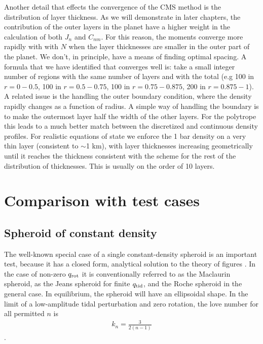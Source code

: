 Another detail that effects the convergence of the CMS method is the distribution of
layer thickness. As we will demonstrate in later chapters, the contribution of the
outer layers in the planet have a higher weight in the calculation of both $J_n$ and
$C_{nm}$. For this reason, the moments converge more rapidly with with $N$ when the
layer thicknesses are smaller in the outer part of the planet. We don't, in
principle, have a means of finding optimal spacing. A formula that we have identified
that converges well is:  take a small integer number of regions with the same number
of layers and with the total (e.g 100 in $r=0-0.5$, 100 in $r=0.5-0.75$, 100 in
$r=0.75-0.875$, 200 in $r=0.875-1$). A related issue is the handling the outer
boundary condition, where the density rapidly changes as a function of radius. A
simple way of handling the boundary is to make the outermost layer half the width of
the other layers. For the polytrope  this leads to a much better match
between the discretized and continuous density profiles. For realistic equations of
state we enforce the 1 bar density on a very thin layer (consistent to $\sim$1 km),
with layer thicknesses increasing geometrically until it reaches the thickness
consistent with the scheme for the rest of the distribution of thicknesses. This is
usually on the order of 10 layers.


\section{Comparison with test cases} \label{tests}

\subsection{Spheroid of constant density} \label{maclaurin}

The well-known special case of a single constant-density spheroid is an
important test, because it has a closed form, analytical solution to the theory
of figures \citep{tassoul2015}. In the case of non-zero $q_{\rm rot}$ it is
conventionally referred to as the Maclaurin spheroid, as the Jeans spheroid for
finite $q_{\rm tid}$, and the Roche spheroid in the general case. In
equilibrium, the spheroid will have an ellipsoidal shape. In the limit of a
low-amplitude tidal perturbation and zero rotation, the love number for all
permitted $n$ is
%
\begin{equation}
\begin{aligned}
    k_n = \frac{3}{2(n-1)}
\end{aligned}
\label{eq:mac_kn}
\end{equation}
%
\citep{munk2009}. 


